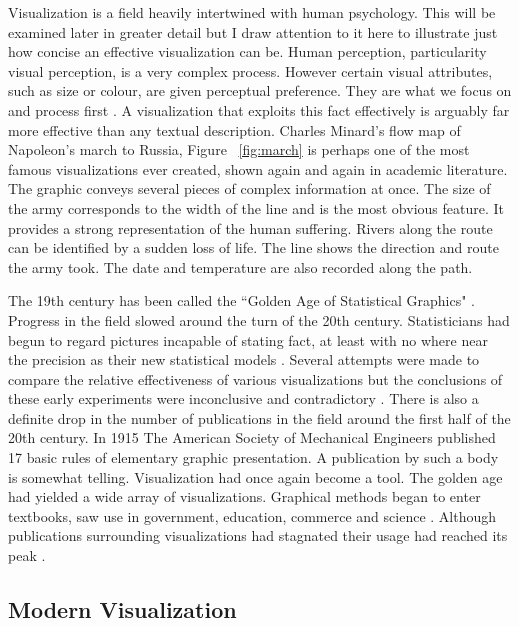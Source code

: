 \documentclass[a4paper, 10pt, titlepage, twocolumn, onehalfspace]{article}
\begin{document}
Visualization is a field heavily intertwined with human psychology. This will be examined later in greater detail but I draw attention to it here to illustrate just how concise an effective visualization can be. Human perception, particularity visual perception, is a very complex process. However certain visual attributes, such as size or colour, are given perceptual preference. They are what we focus on and process first \cite{mackinlay1986automating}. A visualization that exploits this fact effectively is arguably far more effective than any textual description. Charles Minard's flow map of Napoleon's march to Russia, Figure ~\ref{fig:march} is perhaps one of the most famous visualizations ever created, shown again and again in academic literature. The graphic conveys several pieces of complex information at once. The size of the army corresponds to the width of the line and is the most obvious feature. It provides a strong representation of the human suffering. Rivers along the route can be identified by a sudden loss of life. The line shows the direction and route the army took. The date and temperature are also recorded along the path.

The 19th century has been called the ``Golden Age of Statistical Graphics" \cite{friendly2008golden}. Progress in the field slowed around the turn of the 20th century. Statisticians had begun to regard pictures incapable of stating fact, at least with no where near the precision as their new statistical models \cite{friendly2000discussion}. Several attempts were made to compare the relative effectiveness of various visualizations but the conclusions of these early experiments were inconclusive and contradictory \cite{fienberg1979graphical}. There is also a definite drop in the number of publications in the field around the first half of the 20th century. In 1915 The American Society of Mechanical Engineers published 17 basic rules of elementary graphic presentation. A publication by such a body is somewhat telling. Visualization had once again become a tool. The golden age had yielded a wide array of visualizations. Graphical methods began to enter textbooks, saw use in government, education, commerce and science \cite{haskell1919make,ayres1919war,gantt1919organization}. Although publications surrounding visualizations had stagnated their usage had reached its peak \cite{fienberg1979graphical}.

\subsection{Modern Visualization}
\end{document}
